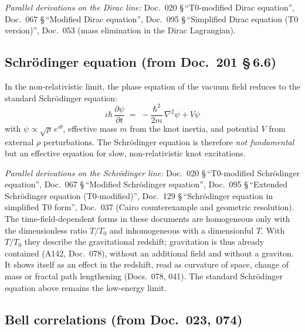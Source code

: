 \textit{Parallel derivations on the Dirac line:}
Doc.~020 \S\,\enquote{T0-modified Dirac equation},
Doc.~067 \S\,\enquote{Modified Dirac equation},
Doc.~095 \S\,\enquote{Simplified Dirac equation (T0 version)},
Doc.~053 (mass elimination in the Dirac Lagrangian).

\subsection*{Schrödinger equation (from Doc.~201 \S\,6.6)}

In the non-relativistic limit, the phase equation of the vacuum field
reduces to the standard Schrödinger equation:
\begin{equation}
  i\hbar\,\frac{\partial\psi}{\partial t}
  \;=\; -\frac{\hbar^{2}}{2m}\,\nabla^{2}\psi + V\psi
  \tag{202.\,QM-4}
\end{equation}
with $\psi \propto \sqrt{\rho}\,e^{i\theta}$, effective mass $m$ from
the knot inertia, and potential $V$ from external $\rho$ perturbations.
The Schrödinger equation is therefore \emph{not fundamental} but an
effective equation for slow, non-relativistic knot excitations.

\textit{Parallel derivations on the Schrödinger line:}
Doc.~020 \S\,\enquote{T0-modified Schrödinger equation},
Doc.~067 \S\,\enquote{Modified Schrödinger equation},
Doc.~095 \S\,\enquote{Extended Schrödinger equation (T0-modified)},
Doc.~129 \S\,\enquote{Schrödinger equation in simplified T0 form},
Doc.~037 (Cairo counterexample and geometric resolution).
The time-field-dependent forms in these documents are homogeneous only with the dimensionless ratio $T/T_0$ and inhomogeneous with a dimensionful $T$. With $T/T_0$ they describe the gravitational redshift; gravitation is thus already contained (A142, Doc.~078), without an additional field and without a graviton. It shows itself as an effect in the redshift, read as curvature of space, change of mass or fractal path lengthening (Docs.~078, 041). The standard Schrödinger equation above remains the low-energy limit.

\subsection*{Bell correlations (from Doc.~023, 074)}

